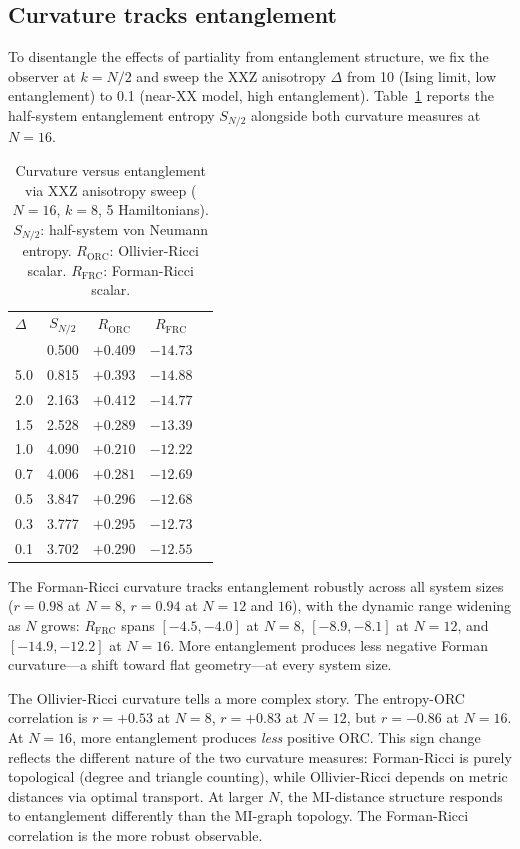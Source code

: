 \documentclass[aps,pra,twocolumn,superscriptaddress]{revtex4-2}
\begin{document}
\subsection{Curvature tracks entanglement}

To disentangle the effects of partiality from entanglement structure, we fix the observer at $k = N/2$ and sweep the XXZ anisotropy $\Delta$ from 10 (Ising limit, low entanglement) to 0.1 (near-XX model, high entanglement). Table~\ref{tab:entanglement} reports the half-system entanglement entropy $S_{N/2}$ alongside both curvature measures at $N = 16$.

\begin{table}[t]
\caption{Curvature versus entanglement via XXZ anisotropy sweep ($N = 16$, $k = 8$, 5 Hamiltonians). $S_{N/2}$: half-system von Neumann entropy. $R_\text{ORC}$: Ollivier-Ricci scalar. $R_\text{FRC}$: Forman-Ricci scalar.}
\label{tab:entanglement}
\begin{ruledtabular}
\begin{tabular}{lcccc}
$\Delta$ & $S_{N/2}$ & $R_\text{ORC}$ & $R_\text{FRC}$ \\
\colrule
10.0 & 0.500 & $+0.409$ & $-14.73$ \\
5.0  & 0.815 & $+0.393$ & $-14.88$ \\
2.0  & 2.163 & $+0.412$ & $-14.77$ \\
1.5  & 2.528 & $+0.289$ & $-13.39$ \\
1.0  & 4.090 & $+0.210$ & $-12.22$ \\
0.7  & 4.006 & $+0.281$ & $-12.69$ \\
0.5  & 3.847 & $+0.296$ & $-12.68$ \\
0.3  & 3.777 & $+0.295$ & $-12.73$ \\
0.1  & 3.702 & $+0.290$ & $-12.55$ \\
\end{tabular}
\end{ruledtabular}
\end{table}

The Forman-Ricci curvature tracks entanglement robustly across all system sizes ($r = 0.98$ at $N = 8$, $r = 0.94$ at $N = 12$ and $16$), with the dynamic range widening as $N$ grows: $R_\text{FRC}$ spans $[-4.5, -4.0]$ at $N = 8$, $[-8.9, -8.1]$ at $N = 12$, and $[-14.9, -12.2]$ at $N = 16$. More entanglement produces less negative Forman curvature---a shift toward flat geometry---at every system size.

The Ollivier-Ricci curvature tells a more complex story. The entropy-ORC correlation is $r = +0.53$ at $N = 8$, $r = +0.83$ at $N = 12$, but $r = -0.86$ at $N = 16$. At $N = 16$, more entanglement produces \emph{less} positive ORC. This sign change reflects the different nature of the two curvature measures: Forman-Ricci is purely topological (degree and triangle counting), while Ollivier-Ricci depends on metric distances via optimal transport. At larger $N$, the MI-distance structure responds to entanglement differently than the MI-graph topology. The Forman-Ricci correlation is the more robust observable.
\end{document}

